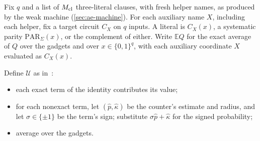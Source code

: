 \documentclass[11pt,letterpaper]{article}
\theoremstyle{definition}
\theoremstyle{remark}
\newcommand{\E}{\mathbb E}
\newcommand{\PAR}{\mathrm{PAR}}
\newcommand{\phat}{\widehat p}
\newcommand{\khat}{\widehat\kappa}
\begin{document}
Fix \(q\) and a list of \(M_{\rm cl}\) three-literal clauses, with fresh
helper names, as produced by the weak machine
(\cref{sec:ae-machine}). For each auxiliary name \(X\), including each
helper, fix a target circuit \(C_X\) on \(q\) inputs. A literal is
\(C_X(x)\), a systematic parity \(\PAR_\Sigma(x)\), or the complement
of either. Write \(\E Q\) for the exact average of \(Q\) over the
gadgets and over \(x\in\{0,1\}^q\), with each auxiliary coordinate
\(X\) evaluated as \(C_X(x)\).

Define \(\mathcal U\) as in~\cite[Section~11.2]{NagCG}:
\begin{itemize}
\item each exact term of the identity contributes its value;
\item for each nonexact term, let \((\phat,\khat)\) be the counter's
estimate and radius, and let \(\sigma\in\{\pm1\}\) be the term's sign;
substitute \(\sigma\phat+\khat\) for the signed probability;
\item average over the gadgets.
\end{itemize}
\end{document}
